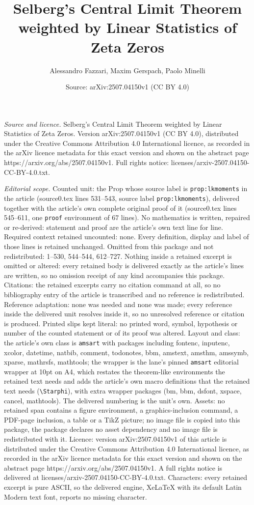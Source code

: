 \documentclass[10pt,a4paper]{amsart}
\title[Selberg's Central Limit Theorem weighted by Linear Statistic]{Selberg's Central Limit Theorem weighted by Linear Statistics of Zeta Zeros}
\author{Alessandro Fazzari, Maxim Gerspach, Paolo Minelli}
\date{Source: arXiv:2507.04150v1 (CC BY 4.0)}
\begin{document}
\maketitle

\noindent\emph{Source and licence.} Selberg's Central Limit Theorem weighted by Linear Statistics of Zeta Zeros. Version arXiv:2507.04150v1 (CC BY 4.0), distributed under the Creative Commons Attribution 4.0 International licence, as recorded in the arXiv licence metadata for this exact version and shown on the abstract page https://arxiv.org/abs/2507.04150v1. Full rights notice: licenses/arxiv-2507.04150-CC-BY-4.0.txt.\par\smallskip

\noindent\textit{Editorial scope.} Counted unit: the Prop whose source label is \texttt{prop:lkmoments} in the article (source0.tex lines 531--543, source label \texttt{prop:lkmoments}), delivered together with the article's own complete original proof of it (source0.tex lines 545--611, one \texttt{proof} environment of 67 lines). No mathematics is written, repaired or re-derived: statement and proof are the article's own text line for line. Required context retained uncounted: none. Every definition, display and label of those lines is retained unchanged. Omitted from this package and not redistributed: 1--530, 544--544, 612--727. Nothing inside a retained excerpt is omitted or altered: every retained body is delivered exactly as the article's lines are written, so no omission receipt of any kind accompanies this package. Citations: the retained excerpts carry no citation command at all, so no bibliography entry of the article is transcribed and no reference is redistributed. Reference adaptation: none was needed and none was made; every reference inside the delivered unit resolves inside it, so no unresolved reference or citation is produced. Printed slips kept literal: no printed word, symbol, hypothesis or number of the counted statement or of its proof was altered. Layout and class: the article's own class is \texttt{amsart} with packages including fontenc, inputenc, xcolor, datetime, natbib, comment, todonotes, bbm, amstext, amsthm, amssymb, xparse, mathrsfs, mathtools; the wrapper is the lane's pinned \texttt{amsart} editorial wrapper at 10pt on A4, which restates the theorem-like environments the retained text needs and adds the article's own macro definitions that the retained text needs (\texttt{\textbackslash Starphi}), with extra wrapper packages (bm, bbm, dsfont, xspace, cancel, mathtools). The delivered numbering is the unit's own. Assets: no retained span contains a figure environment, a graphics-inclusion command, a PDF-page inclusion, a table or a TikZ picture; no image file is copied into this package, the package declares no asset dependency and no image file is redistributed with it. Licence: version arXiv:2507.04150v1 of this article is distributed under the Creative Commons Attribution 4.0 International licence, as recorded in the arXiv licence metadata for this exact version and shown on the abstract page https://arxiv.org/abs/2507.04150v1. A full rights notice is delivered at licenses/arxiv-2507.04150-CC-BY-4.0.txt. Characters: every retained excerpt is pure ASCII, so the delivered engine, XeLaTeX with its default Latin Modern text font, reports no missing character.
\end{document}
